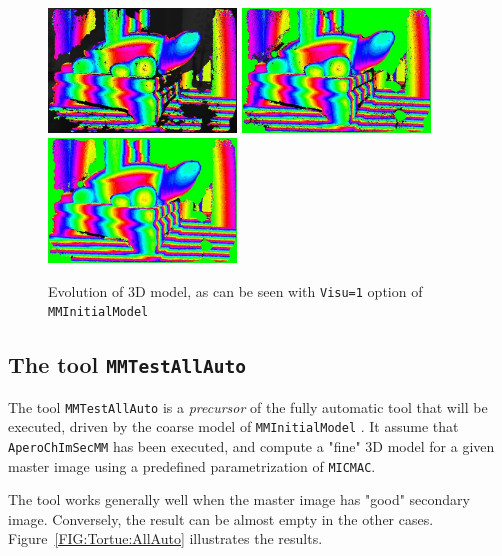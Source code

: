 \begin{figure}
\begin{center}
\includegraphics[width=50mm]{FIGS/Tortue/DumpMMTieP_6.jpg}
\includegraphics[width=50mm]{FIGS/Tortue/DumpMMTieP_7.jpg}
\includegraphics[width=50mm]{FIGS/Tortue/DumpMMTieP_8.jpg}
\end{center}
\caption{Evolution of 3D model, as can be seen with {\tt Visu=1} option
of {\tt MMInitialModel}}
\label{FIG:Tortue:Dump}
\end{figure}



\subsection{The tool {\tt MMTestAllAuto}}

The tool {\tt MMTestAllAuto} is a \emph{precursor} of the fully automatic tool that will
be executed, driven by the coarse model of {\tt MMInitialModel} . It assume that  {\tt AperoChImSecMM}
has been executed, and compute a "fine" 3D model for a given master image using a predefined parametrization
of {\tt MICMAC}.

The tool works generally well when the master image has "good" secondary image. Conversely,
the  result can be almost empty in the other cases. Figure~\ref{FIG:Tortue:AllAuto} illustrates the
results.



